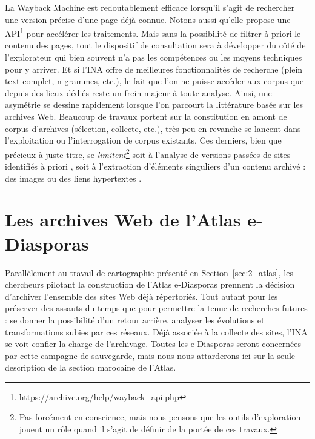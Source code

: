 \documentclass[symmetric,justified,marginals=raggedouter]{tufte-book}
\begin{document}
La Wayback Machine est redoutablement efficace lorsqu'il s'agit de rechercher une version précise d'une page déjà connue. Notons aussi qu'elle propose une API\footnote{\RaggedOuter \url{https://archive.org/help/wayback_api.php}} pour accélérer les traitements. Mais sans la possibilité de filtrer à priori le contenu des pages, tout le dispositif de consultation sera à développer du côté de l'explorateur qui bien souvent n'a pas les compétences ou les moyens techniques pour y arriver. Et si l'INA offre de meilleures fonctionnalités de recherche (plein text complet, n-grammes, etc.), le fait que l'on ne puisse accéder aux corpus que depuis des lieux dédiés reste un frein majeur à toute analyse. Ainsi, une asymétrie se dessine rapidement lorsque l'on parcourt la littérature basée sur les archives Web. Beaucoup de travaux portent sur la constitution en amont de corpus d'archives (sélection, collecte, etc.), très peu en revanche se lancent dans l'exploitation ou l'interrogation de corpus existants. Ces derniers, bien que précieux à juste titre, se \textit{limitent}\footnote{\RaggedOuter Pas forcément en conscience, mais nous pensons que les outils d'exploration jouent un rôle quand il s'agit de définir de la portée de ces travaux.} soit à l'analyse de versions passées de sites identifiés à priori \citep{schafer_web_2016,gebeil_les_2016}, soit à l'extraction d'éléments singuliers d'un contenu archivé : des images \citep{ben-david_colors_2018} ou des liens hypertextes \citep{weltevrede_where_2012}. 

\section{Les archives Web de l'Atlas e-Diasporas}
\label{sec:3_edias}

\noindent Parallèlement au travail de cartographie présenté en Section~\ref{sec:2_atlas}, les chercheurs pilotant la construction de l'Atlas e-Diasporas prennent la décision d'archiver l'ensemble des sites Web déjà répertoriés. Tout autant pour les préserver des assauts du temps \citep{khouzaimi_e-diasporas_2015} que pour permettre la tenue de recherches futures : se donner la possibilité d'un retour arrière, analyser les évolutions et transformations subies par ces réseaux. Déjà associée à la collecte des sites, l'INA se voit confier la charge de l'archivage. Toutes les e-Diasporas seront concernées par cette campagne de sauvegarde, mais  nous nous attarderons ici sur la seule description de la section marocaine de l'Atlas. 
\end{document}
